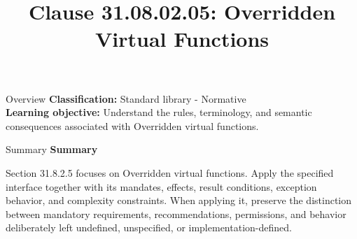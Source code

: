 \documentclass[10pt,letterpaper]{article}
\title{Clause 31.08.02.05: Overridden Virtual Functions}
\author{}
\date{}
\begin{document}
\maketitle
\begin{CornellOverviewBox}{Overview}
\textbf{Classification:} Standard library - Normative\\[2pt]
\textbf{Learning objective:} Understand the rules, terminology, and semantic consequences associated with Overridden virtual functions.
\end{CornellOverviewBox}\begin{CornellSummaryBox}{Summary}
{\sffamily\bfseries\color{Accent} Summary}\par\vspace{3pt}Section 31.8.2.5 focuses on Overridden virtual functions. Apply the specified interface together with its mandates, effects, result conditions, exception behavior, and complexity constraints. When applying it, preserve the distinction between mandatory requirements, recommendations, permissions, and behavior deliberately left undefined, unspecified, or implementation-defined.
\end{CornellSummaryBox}
\end{document}
